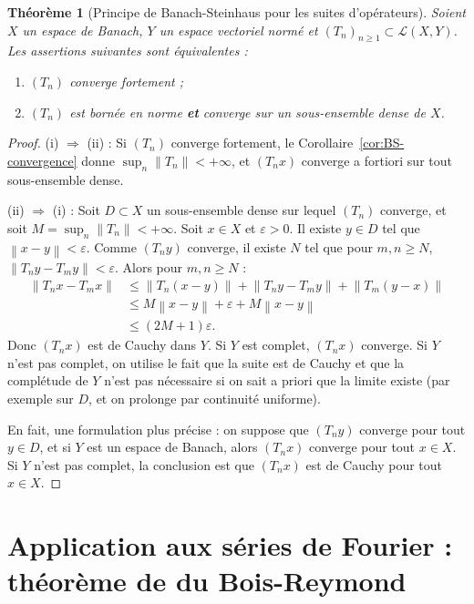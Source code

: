 \documentclass[a4paper,12pt]{book}
\newcommand{\norm}[1]{\left\| #1 \right\|}
\theoremstyle{definition}
\theoremstyle{plain}
\newtheorem{theoreme}[definition]{Théorème}
\theoremstyle{remark}
\begin{document}
\begin{theoreme}[Principe de Banach-Steinhaus pour les suites d'opérateurs]
\label{thm:BS-suites-operateurs}
Soient $X$ un espace de Banach, $Y$ un espace vectoriel normé et
$(T_n)_{n \geq 1} \subset \mathcal{L}(X,Y)$. Les assertions suivantes
sont équivalentes :
\begin{enumerate}[label=(\roman*)]
  \item $(T_n)$ converge fortement ;
  \item $(T_n)$ est bornée en norme \textbf{et} converge sur un sous-ensemble
    dense de $X$.
\end{enumerate}
\end{theoreme}

\begin{proof}
(i) $\Rightarrow$ (ii) : Si $(T_n)$ converge fortement, le
Corollaire~\ref{cor:BS-convergence} donne $\sup_n \norm{T_n} < +\infty$,
et $(T_n x)$ converge a fortiori sur tout sous-ensemble dense.

(ii) $\Rightarrow$ (i) : Soit $D \subset X$ un sous-ensemble dense sur lequel
$(T_n)$ converge, et soit $M = \sup_n \norm{T_n} < +\infty$. Soit $x \in X$ et
$\varepsilon > 0$. Il existe $y \in D$ tel que $\norm{x - y} < \varepsilon$.
Comme $(T_n y)$ converge, il existe $N$ tel que pour $m, n \geq N$,
$\norm{T_n y - T_m y} < \varepsilon$. Alors pour $m, n \geq N$ :
\begin{align*}
  \norm{T_n x - T_m x}
  &\leq \norm{T_n(x-y)} + \norm{T_n y - T_m y} + \norm{T_m(y-x)} \\
  &\leq M\norm{x-y} + \varepsilon + M\norm{x-y} \\
  &\leq (2M+1)\varepsilon.
\end{align*}
Donc $(T_n x)$ est de Cauchy dans $Y$. Si $Y$ est complet, $(T_n x)$ converge.
Si $Y$ n'est pas complet, on utilise le fait que la suite est de Cauchy et que
la complétude de $Y$ n'est pas nécessaire si on sait a priori que la limite existe
(par exemple sur $D$, et on prolonge par continuité uniforme).

En fait, une formulation plus précise : on suppose que $(T_n y)$ converge pour
tout $y \in D$, et si $Y$ est un espace de Banach, alors $(T_n x)$ converge
pour tout $x \in X$. Si $Y$ n'est pas complet, la conclusion est que $(T_n x)$
est de Cauchy pour tout $x \in X$.
\end{proof}


\section{Application aux séries de Fourier : théorème de du Bois-Reymond}
\label{sec:du-bois-reymond}
\end{document}
